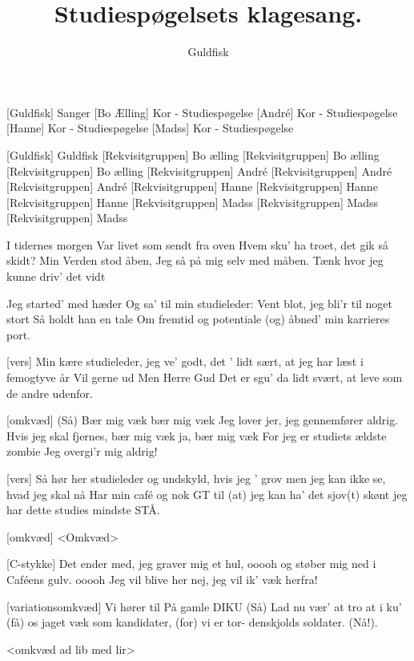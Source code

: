 \documentclass[a4paper,11pt]{article}
\title{Studiespøgelsets klagesang.}
\author{Guldfisk}
\begin{document}
\maketitle

\begin{roles}  
[Guldfisk] Sanger
[Bo Ælling] Kor - Studiespøgelse
[André] Kor - Studiespøgelse
[Hanne] Kor - Studiespøgelse
[Madss] Kor - Studiespøgelse
\end{roles}

\begin{props}
[Guldfisk] Guldfisk
[Rekvisitgruppen] Bo ælling
[Rekvisitgruppen] Bo ælling
[Rekvisitgruppen] Bo ælling
[Rekvisitgruppen] André
[Rekvisitgruppen] André
[Rekvisitgruppen] André
[Rekvisitgruppen] Hanne
[Rekvisitgruppen] Hanne
[Rekvisitgruppen] Hanne 
[Rekvisitgruppen] Madss
[Rekvisitgruppen] Madss
[Rekvisitgruppen] Madss
\end{props}


\begin{song}
 I tidernes morgen
Var livet som sendt fra oven
Hvem sku' ha troet, det gik så skidt?
Min Verden stod åben,
Jeg så på mig selv med måben.
Tænk hvor jeg kunne driv' det vidt
 
Jeg started' med hæder
Og sa' til min studieleder:
Vent blot, jeg bli'r til noget stort
Så holdt han en tale
Om fremtid og potentiale
(og) åbned' min karrieres port.
 
 
[vers] Min kære studieleder, jeg ve' godt, det ' lidt sært,
at jeg har læst i femogtyve år
Vil gerne ud
Men Herre Gud
Det er sgu' da lidt svært,
at leve som de andre udenfor.

[omkvæd] (Så) Bær mig væk
bær mig væk
Jeg lover jer, jeg gennemfører aldrig.
Hvis jeg skal fjernes, bær mig væk
ja, bær mig væk
For jeg er studiets ældste zombie
Jeg overgi'r mig aldrig!
 
[vers] Så hør her studieleder og undskyld, hvis jeg ' grov
men jeg kan ikke se, hvad jeg skal nå
Har min café
og nok GT
til (at) jeg kan ha' det sjov(t)
skønt jeg har dette studies mindste STÅ.
 
[omkvæd] <Omkvæd>
 
[C-stykke]
Det ender med, jeg graver mig et hul,
ooooh
og støber mig ned i Caféens gulv.
ooooh
Jeg vil blive her
nej, jeg vil ik' væk herfra!
 
[variationsomkvæd]
Vi hører til
På gamle DIKU (Så)
Lad nu vær'
at tro at i ku' (få)
os jaget væk
som kandidater, (for)
vi er tor-
denskjolds soldater. (Nå!).

 <omkvæd ad lib med lir>
\end{song}
\end{document}
